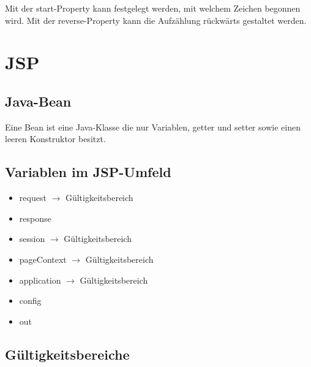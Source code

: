 \documentclass[11pt]{article}
\begin{document}
			Mit der start-Property kann festgelegt werden, mit welchem Zeichen begonnen wird. \newline
			Mit der reverse-Property kann die Aufzählung rückwärts gestaltet werden.
			
	\section{JSP}
	
		\subsection{Java-Bean}
			Eine Bean ist eine Java-Klasse die nur Variablen, getter und setter sowie einen leeren Konstruktor besitzt.
			
		\subsection{Variablen im JSP-Umfeld}
			\begin{itemize}
				\item request $\rightarrow$ Gültigkeitsbereich
				\item response
				\item session $\rightarrow$ Gültigkeitsbereich
				\item pageContext $\rightarrow$ Gültigkeitsbereich
				\item application $\rightarrow$ Gültigkeitsbereich
				\item config
				\item out
			\end{itemize}
		
		\subsection{Gültigkeitsbereiche}
		
\end{document}
